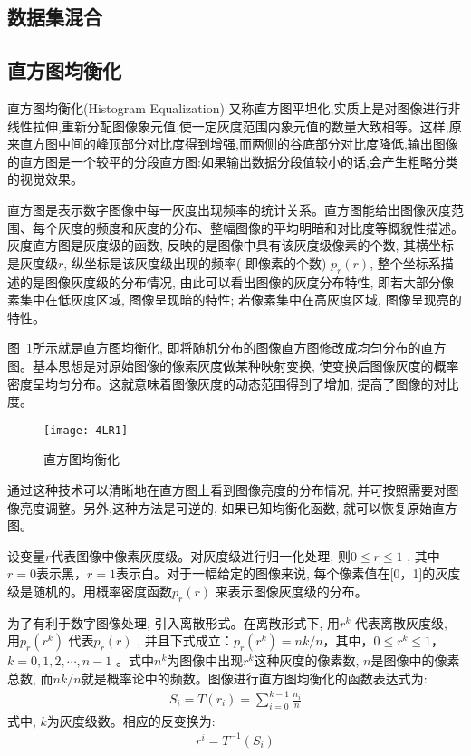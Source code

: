 \subsection{数据集混合}



\subsection{直方图均衡化}

直方图均衡化(Histogram Equalization) 又称直方图平坦化,实质上是对图像进行非线性拉伸,重新分配图像象元值,使一定灰度范围内象元值的数量大致相等。这样,原来直方图中间的峰顶部分对比度得到增强,而两侧的谷底部分对比度降低,输出图像的直方图是一个较平的分段直方图:如果输出数据分段值较小的话,会产生粗略分类的视觉效果。

直方图是表示数字图像中每一灰度出现频率的统计关系。直方图能给出图像灰度范围、每个灰度的频度和灰度的分布、整幅图像的平均明暗和对比度等概貌性描述。灰度直方图是灰度级的函数, 反映的是图像中具有该灰度级像素的个数, 其横坐标是灰度级$r$, 纵坐标是该灰度级出现的频率( 即像素的个数) $p_{r}(r)$, 整个坐标系描述的是图像灰度级的分布情况, 由此可以看出图像的灰度分布特性, 即若大部分像素集中在低灰度区域, 图像呈现暗的特性; 若像素集中在高灰度区域, 图像呈现亮的特性。

图~\ref{fig20}所示就是直方图均衡化, 即将随机分布的图像直方图修改成均匀分布的直方图。基本思想是对原始图像的像素灰度做某种映射变换, 使变换后图像灰度的概率密度呈均匀分布。这就意味着图像灰度的动态范围得到了增加, 提高了图像的对比度。

\begin{figure}[!htb]
\centering
\texttt{[image: 4LR1]}
\caption{直方图均衡化}
\label{fig20}
\end{figure}

通过这种技术可以清晰地在直方图上看到图像亮度的分布情况, 并可按照需要对图像亮度调整。另外,这种方法是可逆的, 如果已知均衡化函数, 就可以恢复原始直方图。

设变量$r$代表图像中像素灰度级。对灰度级进行归一化处理, 则$0\leqslant r\leqslant 1$ , 其中$r=0$表示黑，$r=1$表示白。对于一幅给定的图像来说, 每个像素值在[0，1]的灰度级是随机的。用概率密度函数$p_{r}(r)$ 来表示图像灰度级的分布。

为了有利于数字图像处理, 引入离散形式。在离散形式下, 用$r^{k}$ 代表离散灰度级, 用$p_{r}(r^{k})$ 代表$p_{r}(r)$ , 并且下式成立：$p_{r}(r^{k})=nk/n$，其中，$0\leqslant r^{k}\leqslant 1$，$k=0,1,2,\cdots ,n-1$ 。式中$n^{k}$为图像中出现$r^{k}$这种灰度的像素数, $n$是图像中的像素总数, 而$nk/n$就是概率论中的频数。图像进行直方图均衡化的函数表达式为:
\begin{equation}
 \label{eq6}
 \begin{split}
   S_{i}=T(r_{i})=\sum_{i=0}^{k-1}\frac{n_{i}}{n}
 \end{split}
\end{equation}
式中, $k$为灰度级数。相应的反变换为:
\begin{equation}
 \label{eq6}
 \begin{split}
   r^{i}=T^{-1}(S_{i})
 \end{split}
\end{equation}

